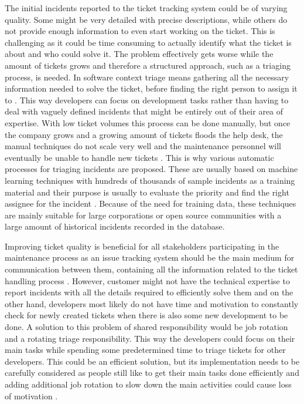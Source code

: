The initial incidents reported to the ticket tracking system could be of varying quality. Some might be very detailed with precise descriptions, while others do not provide enough
information to even start working on the ticket. This is challenging as it could be time consuming to actually identify what the ticket is about and who could solve it.
The problem effectively gets worse while the amount of tickets grows and therefore a structured approach, such as a triaging process, is needed.
In software context triage means gathering
all the necessary information needed to solve the ticket, before finding the right person to assign it to \citep{Ruefle2013}. This way developers can focus on
development tasks rather than having to deal with vaguely defined incidents that might be entirely out of their area of expertise. With low ticket volumes this process can be done
manually, but once the company grows and a growing amount of tickets floods the help desk, the manual techniques do not scale very well and the maintenance personnel will eventually be unable to handle new tickets
\citep{Hu2014}. This is why various automatic processes for triaging incidents are proposed. These are usually based on machine learning techniques with hundreds of thousands of
sample incidents as a training material and their purpose is usually to evaluate the priority and find the right assignee for the incident \citep{Hu2014}. Because of the need for training data,
these techniques are mainly suitable for large corporations or open source communities with a large amount of historical incidents recorded in the database.

Improving ticket quality is beneficial for all stakeholders participating in the maintenance process as an issue tracking system should be the main medium for communication between
them, containing all the information related to the ticket handling process \citep{Bertram2010}. However, customer might not have the technical expertise to report incidents with all
the details required to efficiently solve them and on the other hand, developers most likely do not have time and motivation to constantly check for newly created tickets when 
there is also some new development to be done. A solution to this problem of shared responsibility would be job rotation \citep{Faegri2009}
and a rotating triage responsibility. This way the developers could focus on their main tasks while spending some predetermined time to triage tickets for other developers.
This could be an efficient solution, but its implementation needs to be carefully considered as people still like to get their main tasks done efficiently and adding additional
job rotation to slow down the main activities could cause loss of motivation \citep{Faegri2009}.

